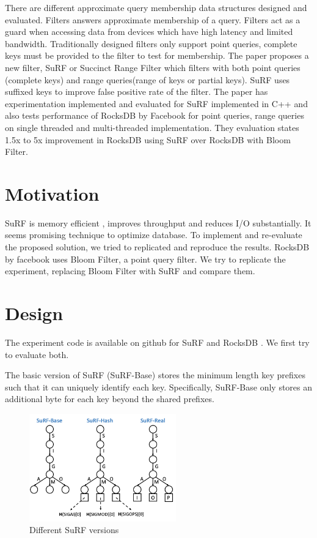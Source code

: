 \documentclass[12pt,conference]{IEEEtran}
\begin{document}
There are different approximate query membership data structures designed and evaluated. Filters answers approximate membership of a query. Filters act as a guard when accessing data from devices which have high latency and limited bandwidth. Traditionally designed filters only support point queries, complete keys must be provided to the filter to test for membership. The paper \cite{1} proposes a new filter, SuRF or Succinct Range Filter which filters with both point queries (complete keys) and range queries(range of keys or partial keys). SuRF uses suffixed keys to improve false positive rate of the filter. The paper \cite{1} has experimentation implemented and evaluated for SuRF implemented in C++ \cite{3} and also tests performance \cite{4} of RocksDB \cite{2} by Facebook for point queries, range queries on single threaded and multi-threaded implementation. They evaluation states 1.5x to 5x improvement in RocksDB using SuRF over RocksDB with Bloom Filter. 

\section{Motivation}

SuRF is memory efficient \cite{1}, improves throughput and reduces I/O substantially. It seems promising technique to optimize database. To implement and re-evaluate the proposed solution, we tried to replicated and reproduce the results. RocksDB by facebook \cite{2} uses Bloom Filter, a point query filter. We try to replicate the experiment, replacing Bloom Filter with SuRF and compare them.


\section{Design}
The experiment code is available on github for SuRF \cite{3} and RocksDB \cite{2}. We first try to evaluate both.

The basic version of SuRF (SuRF-Base) stores the minimum length key prefixes such that it can uniquely identify each key. Specifically, SuRF-Base only stores an additional byte for each key
beyond the shared prefixes.

\begin{figure}[H]
\centering
\includegraphics[width=2.5in]{surf}
\caption{Different SuRF versions}
\end{figure}
\end{document}

